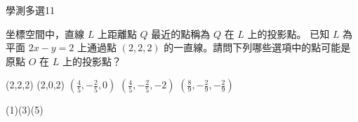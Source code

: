     \begin{QUESTION}
        \begin{ExamInfo}{99}{學測}{多選}{11}
        \end{ExamInfo}
        \begin{ExamAnsRateInfo}{17}{25}{16}{10}
        \end{ExamAnsRateInfo}
        \begin{QBODY}
            坐標空間中，直線 $L$ 上距離點 $Q$ 最近的點稱為 $Q$ 在 $L$ 上的投影點。 已知 $L$ 為平面 $2x-y=2$ 上通過點 $(2, 2, 2)$ 的一直線。請問下列哪些選項中的點可能是原點 $O$ 在 $L$ 上的投影點？ 
			\begin{QOPS} 
				\QOP (2,2,2) 
				\QOP (2,0,2) 
				\QOP $(\frac{4}{5},-\frac{2}{5},0)$ 
				\QOP $(\frac{4}{5},-\frac{2}{5},-2)$ 
				\QOP $(\frac{8}{9},-\frac{2}{9},-\frac{2}{9})$
			\end{QOPS}
        \end{QBODY}
        \begin{QFROMS}
        \end{QFROMS}
        \begin{QTAGS}\end{QTAGS}
        \begin{QANS}
            (1)(3)(5)
        \end{QANS}
        \begin{QSOLLIST}
        \end{QSOLLIST}
        \begin{QEMPTYSPACE}
        \end{QEMPTYSPACE}
    \end{QUESTION}
